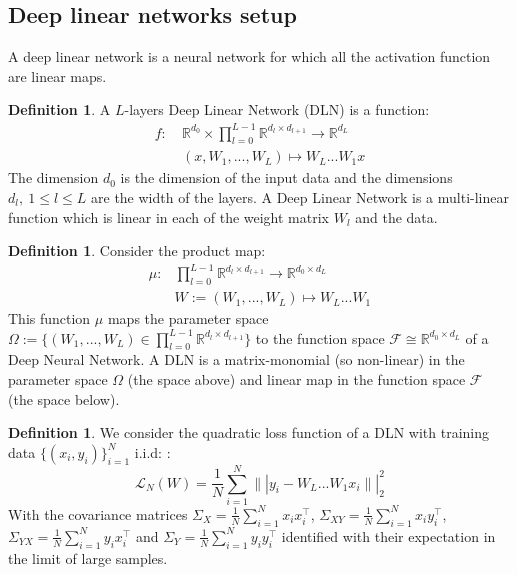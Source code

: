 \documentclass{article}
\theoremstyle{definition}
\newtheorem{definition}[theorem]{Definition}
\begin{document}
\subsection{Deep linear networks setup}
A deep linear network is a neural network for which all the activation function are linear maps. 
\begin{definition}\label{def:dln-function}
    A $L$-layers Deep Linear Network (DLN) is a function:
\begin{align*}
    f: \ & \mathbb{R}^{d_0} \times \prod_{l=0}^{L-1}\mathbb{R}^{d_l \times d_{l+1}}  \to \mathbb{R}^{d_L} \\
       & (x,W_1,...,W_L) \mapsto W_L...W_1 x
\end{align*}
The dimension $d_0$ is the dimension of the input data and the dimensions $d_l,\ 1\leq l \leq L$ are the width of the layers. A Deep Linear Network is a multi-linear function which is linear in each of the weight matrix $W_l$ and the data.
\end{definition}
\begin{definition}\label{def:product-map}
    Consider the product map:
\begin{align*}
    \mu : & \prod_{l=0}^{L-1}\mathbb{R}^{d_l \times d_{l+1}} \to \mathbb{R}^{d_0\times d_L}\\
           &  W:=(W_1,...,W_L) \mapsto W_L...W_1
\end{align*}
This function $\mu$ maps the parameter space $\Omega:=\{(W_1,...,W_L) \in \prod_{l=0}^{L-1}\mathbb{R}^{d_l \times d_{l+1}}\}$ to the function space $\mathcal{F} \cong \mathbb{R}^{d_0\times d_L}$ of a Deep Neural Network. A DLN is a matrix-monomial (so non-linear) in the parameter space $\Omega$ (the space above) and linear map in the function space $\mathcal{F}$ (the space below).
\end{definition}
\begin{definition}
We consider the quadratic loss function of a DLN with training data $\{(x_i,y_i)\}_{i=1}^N$ i.i.d: :
    \begin{equation*}
        \mathcal{L}_N(W) = \frac{1}{N}\sum_{i=1}^N \||y_i - W_L...W_1 x_i\||_2^2
    \end{equation*}
With the covariance matrices $\Sigma_X = \frac{1}{N}\sum_{i=1}^N x_i x_i^\top$, $\Sigma_{XY} = \frac{1}{N}\sum_{i=1}^N x_i y_i^\top$, $\Sigma_{YX} = \frac{1}{N}\sum_{i=1}^N y_i x_i^\top$ and $\Sigma_Y = \frac{1}{N}\sum_{i=1}^N y_i y_i^\top$ identified with their expectation in the limit of large samples.
\end{definition}
\end{document}
